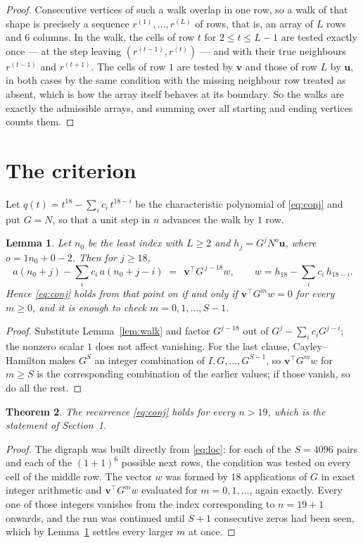 \documentclass[11pt,a4paper]{article}
\theoremstyle{plain}
\newtheorem{theorem}{Theorem}
\newtheorem{lemma}[theorem]{Lemma}
\theoremstyle{definition}
\begin{document}
\begin{proof}
Consecutive vertices of such a walk overlap in one row, so a walk of that shape is
precisely a sequence $r^{(1)},\dots,r^{(L)}$ of rows, that is, an array of $L$ rows
and $6$ columns. In the walk, the cells of row $t$ for $2\le t\le L-1$ are tested
exactly once --- at the step leaving $(r^{(t-1)},r^{(t)})$ --- and with their true
neighbours $r^{(t-1)}$ and $r^{(t+1)}$. The cells of row $1$ are tested by
$\mathbf{v}$ and those of row $L$ by $\mathbf{u}$, in both cases by the same condition
with the missing neighbour row treated as absent, which is how the array itself behaves at
its boundary. So the walks are exactly the admissible arrays, and summing over all starting
and ending vertices counts them.
\end{proof}

\section{The criterion}

Let $q(t)=t^{18}-\sum_i c_i\,t^{18-i}$ be the characteristic polynomial of
\eqref{eq:conj} and put $G=N$, so that a unit step in $n$ advances the walk by
$1$ row.

\begin{lemma}\label{lem:crit}
Let $n_0$ be the least index with $L\ge2$ and $h_j=G^{j}N^{o}\mathbf{u}$, where
$o=1n_0+0-2$. Then for $j\ge18$,
\[
a(n_0+j)-\sum_i c_i\,a(n_0+j-i)\;=\;\,\mathbf{v}^{\!\top}G^{\,j-18}w,
\qquad w=h_{18}-\sum_i c_i\,h_{18-i} .
\]
Hence \eqref{eq:conj} holds from that point on if and only if
$\mathbf{v}^{\!\top}G^{m}w=0$ for every $m\ge0$, and it is enough to check
$m=0,1,\dots,S-1$.
\end{lemma}

\begin{proof}
Substitute Lemma~\ref{lem:walk} and factor $G^{j-18}$ out of
$G^{j}-\sum_ic_iG^{j-i}$; the nonzero scalar $1$ does not affect
vanishing. For the last clause, Cayley--Hamilton makes $G^{S}$ an integer combination of
$I,G,\dots,G^{S-1}$, so $\mathbf{v}^{\!\top}G^{m}w$ for $m\ge S$ is the corresponding
combination of the earlier values; if those vanish, so do all the rest.
\end{proof}

\begin{theorem}
The recurrence \eqref{eq:conj} holds for every $n>19$, which is the statement of
Section~1.
\end{theorem}

\begin{proof}
The digraph was built directly from \eqref{eq:loc}: for each of the $S=4096$ pairs and each
of the $(1+1)^{6}$ possible next rows, the condition was tested on every cell of
the middle row. The vector $w$ was formed by $18$ applications of $G$ in exact integer
arithmetic and $\mathbf{v}^{\!\top}G^{m}w$ evaluated for $m=0,1,\dots$, again exactly.
Every one of those integers vanishes from the index corresponding to $n=19+1$ onwards,
and the run was continued until $S+1$ consecutive zeros had been seen, which by
Lemma~\ref{lem:crit} settles every larger $m$ at once.
\end{proof}
\end{document}
